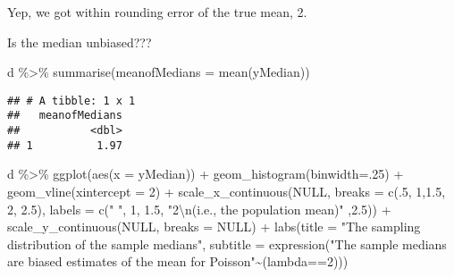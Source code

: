 \documentclass[
]{article}
\newenvironment{Shaded}{\begin{snugshade}}{\end{snugshade}}
\newcommand{\AttributeTok}[1]{\textcolor[rgb]{0.77,0.63,0.00}{#1}}
\newcommand{\ConstantTok}[1]{\textcolor[rgb]{0.00,0.00,0.00}{#1}}
\newcommand{\DecValTok}[1]{\textcolor[rgb]{0.00,0.00,0.81}{#1}}
\newcommand{\FloatTok}[1]{\textcolor[rgb]{0.00,0.00,0.81}{#1}}
\newcommand{\FunctionTok}[1]{\textcolor[rgb]{0.00,0.00,0.00}{#1}}
\newcommand{\NormalTok}[1]{#1}
\newcommand{\SpecialCharTok}[1]{\textcolor[rgb]{0.00,0.00,0.00}{#1}}
\newcommand{\StringTok}[1]{\textcolor[rgb]{0.31,0.60,0.02}{#1}}
\begin{document}
Yep, we got within rounding error of the true mean, 2.

Is the median unbiased???

\begin{Shaded}
\begin{Highlighting}[]
\NormalTok{d }\SpecialCharTok{\%\textgreater{}\%} 
  \FunctionTok{summarise}\NormalTok{(}\AttributeTok{meanofMedians =} \FunctionTok{mean}\NormalTok{(yMedian))}
\end{Highlighting}
\end{Shaded}

\begin{verbatim}
## # A tibble: 1 x 1
##   meanofMedians
##           <dbl>
## 1          1.97
\end{verbatim}

\begin{Shaded}
\begin{Highlighting}[]
\NormalTok{d }\SpecialCharTok{\%\textgreater{}\%} 
  \FunctionTok{ggplot}\NormalTok{(}\FunctionTok{aes}\NormalTok{(}\AttributeTok{x =}\NormalTok{ yMedian)) }\SpecialCharTok{+}
  \FunctionTok{geom\_histogram}\NormalTok{(}\AttributeTok{binwidth=}\NormalTok{.}\DecValTok{25}\NormalTok{) }\SpecialCharTok{+}
  \FunctionTok{geom\_vline}\NormalTok{(}\AttributeTok{xintercept =} \DecValTok{2}\NormalTok{) }\SpecialCharTok{+}
  \FunctionTok{scale\_x\_continuous}\NormalTok{(}\ConstantTok{NULL}\NormalTok{, }
                     \AttributeTok{breaks =} \FunctionTok{c}\NormalTok{(.}\DecValTok{5}\NormalTok{, }\DecValTok{1}\NormalTok{,}\FloatTok{1.5}\NormalTok{, }\DecValTok{2}\NormalTok{, }\FloatTok{2.5}\NormalTok{),}
                     \AttributeTok{labels =} \FunctionTok{c}\NormalTok{(}\StringTok{" "}\NormalTok{, }\DecValTok{1}\NormalTok{, }\FloatTok{1.5}\NormalTok{,  }\StringTok{"2}\SpecialCharTok{\textbackslash{}n}\StringTok{(i.e., the population mean)"}\NormalTok{ ,}\FloatTok{2.5}\NormalTok{)) }\SpecialCharTok{+}
  \FunctionTok{scale\_y\_continuous}\NormalTok{(}\ConstantTok{NULL}\NormalTok{, }\AttributeTok{breaks =} \ConstantTok{NULL}\NormalTok{) }\SpecialCharTok{+}
  \FunctionTok{labs}\NormalTok{(}\AttributeTok{title =} \StringTok{"The sampling distribution of the sample medians"}\NormalTok{, }\AttributeTok{subtitle =} \FunctionTok{expression}\NormalTok{(}\StringTok{"The sample medians are biased estimates of the mean for Poisson"}\SpecialCharTok{\textasciitilde{}}\NormalTok{(lambda}\SpecialCharTok{==}\DecValTok{2}\NormalTok{)))}
\end{Highlighting}
\end{Shaded}
\end{document}
